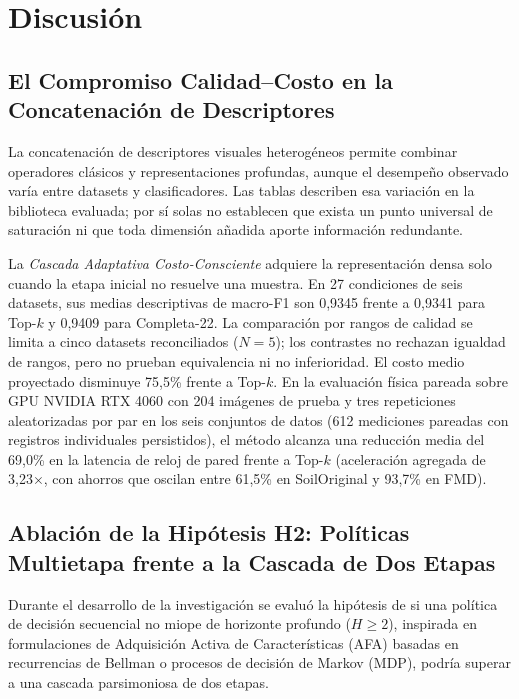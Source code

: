 \chapter{Discusión}\label{sec:discusion}

\section{El Compromiso Calidad--Costo en la Concatenación de Descriptores}

La concatenación de descriptores visuales heterogéneos permite combinar operadores clásicos y representaciones profundas, aunque el desempeño observado varía entre datasets y clasificadores. Las tablas describen esa variación en la biblioteca evaluada; por sí solas no establecen que exista un punto universal de saturación ni que toda dimensión añadida aporte información redundante.

La \emph{Cascada Adaptativa Costo-Consciente} adquiere la representación densa solo cuando la etapa inicial no resuelve una muestra. En 27 condiciones de seis datasets, sus medias descriptivas de macro-F1 son 0{,}9345 frente a 0{,}9341 para Top-$k$ y 0{,}9409 para Completa-22. La comparación por rangos de calidad se limita a cinco datasets reconciliados ($N=5$); los contrastes no rechazan igualdad de rangos, pero no prueban equivalencia ni no inferioridad. El costo medio proyectado disminuye 75{,}5\% frente a Top-$k$. En la evaluación física pareada sobre GPU NVIDIA RTX 4060 con 204 imágenes de prueba y tres repeticiones aleatorizadas por par en los seis conjuntos de datos (612 mediciones pareadas con registros individuales persistidos), el método alcanza una reducción media del 69{,}0\% en la latencia de reloj de pared frente a Top-$k$ (aceleración agregada de 3{,}23$\times$, con ahorros que oscilan entre 61{,}5\% en SoilOriginal y 93{,}7\% en FMD).

\section{Ablación de la Hipótesis H2: Políticas Multietapa frente a la Cascada de Dos Etapas}

Durante el desarrollo de la investigación se evaluó la hipótesis de si una política de decisión secuencial no miope de horizonte profundo ($H \ge 2$), inspirada en formulaciones de Adquisición Activa de Características (AFA) basadas en recurrencias de Bellman o procesos de decisión de Markov (MDP), podría superar a una cascada parsimoniosa de dos etapas.


